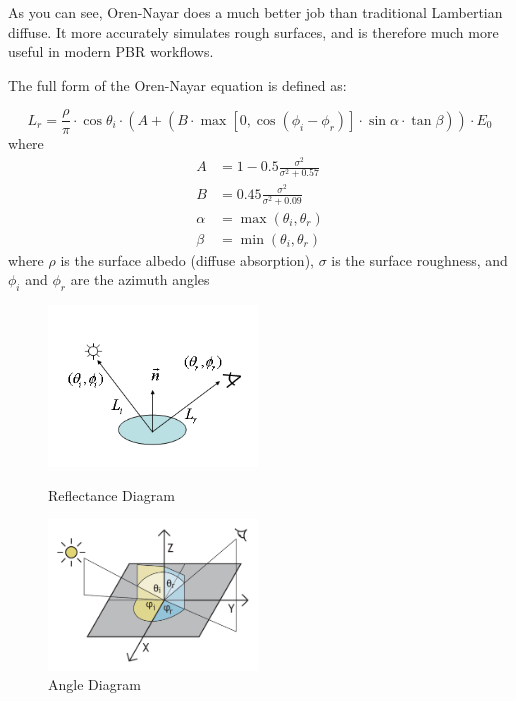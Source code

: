 \documentclass[12pt,letterpaper]{article}
\begin{document}
As you can see, Oren-Nayar does a much better job than traditional Lambertian diffuse. 
It more accurately simulates rough surfaces, and is therefore much more useful in modern PBR workflows.

The full form of the Oren-Nayar equation is defined as:

$$
L_{r}={\frac{\rho}{\pi}}\cdot \cos \theta_{i} \cdot (A + (B \cdot \max[0, \cos(\phi_i - \phi_r)] \cdot \sin \alpha \cdot \tan \beta )) \cdot E_{0}
$$
where
\begin{align*}
A &= 1 - 0.5{\frac{\sigma^{2}}{\sigma^{2} + 0.57}}\\
B &= 0.45 {\frac{\sigma^{2}}{\sigma^{2} + 0.09}}\\
\alpha &= \max(\theta_{i}, \theta_{r})\\
\beta &= \min(\theta_{i}, \theta_{r})
\end{align*}
where $\rho$ is the surface albedo (diffuse absorption), $\sigma$ is the surface roughness, and $\phi_i$ and $\phi_r$ are the azimuth angles
\begin{figure}[htbp]
    \begin{minipage}[b]{0.5\linewidth}
        \centering
        \includegraphics[width=15em]{Oren-nayar-reflection}
        \caption{Reflectance Diagram}
    \end{minipage}
    \hspace{-6pt}
    \begin{minipage}[b]{0.5\linewidth}
        \centering
        \includegraphics[width=15em]{Angle_overview}
        \caption{Angle Diagram}
    \end{minipage}    
\end{figure}

\newpage
\end{document}
